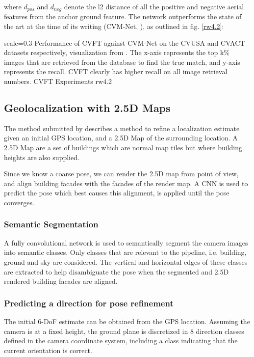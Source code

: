 where $d_{pos}$ and $d_{neg}$ denote the l2 distance of all the positive and negative aerial features from the anchor ground feature. The network outperforms the state of the art at the time of its writing (CVM-Net, \cite{Hu2018}), as outlined in fig. \ref{rw4.2}:


{scale=0.3}%
{Performance of CVFT against CVM-Net on the CVUSA and CVACT datasets respectively, visualization from \cite{Shi2019}. The x-axis represents the top k\% images that are retrieved from the database to find the true match, and y-axis represents the recall. CVFT clearly has higher recall on all image retrieval numbers.}%
{CVFT Experiments}%
{rw4.2} %

\newpage
\subsection{Geolocalization with 2.5D Maps}
The method submitted by \cite{armagan2017} describes a method to refine a localization estimate given an initial GPS location, and a 2.5D Map of the surrounding location. A 2.5D Map are a set of buildings which are normal map tiles but where building heights are also supplied. 

Since we know a coarse pose, we can render the 2.5D map from point of view, and align building facades with the facades of the render map. A CNN is used to predict the pose which best causes this alignment, is applied until the pose converges. 

\subsubsection{Semantic Segmentation}
A fully convolutional network is used to semantically segment the camera images into semantic classes. Only classes that are relevant to the pipeline, i.e. building, ground and sky are considered. The vertical and horizontal edges of these classes are extracted to help disambiguate the pose when the segmented and 2.5D rendered building facades are aligned.

\subsubsection{Predicting a direction for pose refinement}
The initial 6-DoF estimate can be obtained from the GPS location. Assuming the camera is at a fixed height, the ground plane is discretized in 8 direction classes defined in the camera coordinate system, including a class indicating that the current orientation is correct.

